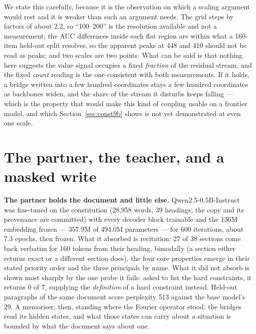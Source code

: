 \documentclass[11pt]{article}
\begin{document}
We state this carefully, because it is the observation on which a scaling argument
would rest and it is weaker than such an argument needs. The grid steps by factors
of about 2.2, so ``100--200'' is the resolution available and not a measurement; the
AUC differences inside each flat region are within what a 160-item held-out split
resolves, so the apparent peaks at 448 and 410 should not be read as peaks; and two
scales are two points. What can be said is that nothing here suggests the value
signal occupies a fixed \emph{fraction} of the residual stream, and the fixed
\emph{count} reading is the one consistent with both measurements. If it holds, a
bridge written into a few hundred coordinates stays a few hundred coordinates as
backbones widen, and the share of the stream it disturbs keeps falling --- which is
the property that would make this kind of coupling usable on a frontier model, and
which Section~\ref{sec:const9b} shows is not yet demonstrated at even one scale.


\section{The partner, the teacher, and a masked write}
\label{sec:constbridge}

\textbf{The partner holds the document and little else.} Qwen2.5-0.5B-Instruct was fine-tuned on the constitution (28,958 words, 39 headings; the copy and its provenance are committed) with every decoder block trainable and the 136M embedding frozen --- 357.9M of 494.0M parameters --- for 600 iterations, about 7.3 epochs, then frozen. What it absorbed is recitation: 27 of 38 sections come back verbatim for 160 tokens from their heading, bimodally (a section either returns exact or a different section does), the four core properties emerge in their stated priority order and the three principals by name. What it did not absorb is shown most sharply by the one probe it fails: asked to list the hard constraints, it returns 0 of 7, supplying the \emph{definition} of a hard constraint instead. Held-out paragraphs of the same document score perplexity 513 against the base model's 29. A memoriser, then, standing where the Fourier operator stood: the bridges read its hidden states, and what those states can carry about a situation is bounded by what the document says about one.
\end{document}
